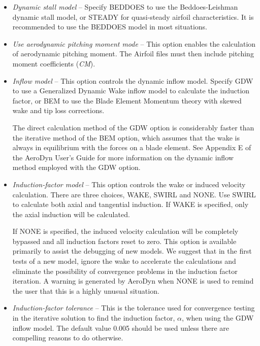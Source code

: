 \begin{itemize}
\item{\sl Dynamic stall model} --
  Specify BEDDOES to use the Beddoes-Leishman dynamic stall model,
  or STEADY for quasi-steady airfoil characteristics.
  It is recommended to use the BEDDOES model in most situations.

\item{\sl Use aerodynamic pitching moment mode} --
  This option enables the calculation of aerodynamic pitching moment.
  The Airfoil files must then include pitching moment coefficients ({\sl CM}).

\item{\sl Inflow model} --
  This option controls the dynamic inflow model.
  Specify GDW to use a Generalized Dynamic Wake inflow model to  calculate the
  induction factor, or BEM to use the Blade Element Momentum theory with skewed
  wake and tip loss corrections.

  The direct calculation method of the GDW option is considerably faster than
  the iterative method of the BEM option, which assumes that the wake is always
  in equilibrium with the forces on a blade element.
  See Appendix E of the AeroDyn User's Guide for more information on the dynamic
  inflow method employed with the GDW option.

\item{\sl Induction-factor model} --
  This option controls the wake or induced velocity calculation.
  There are three choices, WAKE, SWIRL and NONE.
  Use SWIRL to calculate both axial and tangential induction.
  If WAKE is specified, only the axial induction will be calculated.

  If NONE is specified, the induced velocity calculation will be completely
  bypassed and all induction factors reset to zero.
  This option is available primarily to assist the debugging of new models.
  We suggest that in the first tests of a new model, ignore the wake to
  accelerate the calculations and eliminate the possibility of convergence
  problems in the induction factor iteration. A warning is generated by AeroDyn
  when NONE is used to remind the user that this is a highly unusual situation.

\item{\sl Induction-factor tolerance} --
  This is the tolerance used for convergence testing in the iterative solution
  to find the induction factor, $\alpha$, when using the GDW inflow model.
  The default value 0.005 should be used unless there are compelling reasons
  to do otherwise.


\end{itemize}
